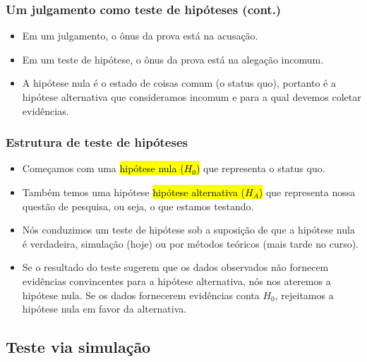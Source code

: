 
\begin{frame}
\frametitle{Um julgamento como teste de hipóteses (cont.)}

\begin{itemize}
\justifying
\item Em um julgamento, o ônus da prova está na acusação.
\justifying
\item Em um teste de hipótese, o ônus da prova está na alegação incomum.
\justifying
\item A hipótese nula é o estado de coisas comum (o status quo), portanto é a hipótese alternativa que consideramos incomum e para a qual devemos coletar evidências.

\end{itemize}

\end{frame}


\begin{frame}
\frametitle{Estrutura de teste de hipóteses}

\begin{itemize}
\justifying
\item Começamos com uma \hl {hipótese nula ($ H_0 $)} que representa o status quo.
\justifying
\item Também temos uma hipótese \hl {hipótese alternativa ($ H_A $)} que representa nossa questão de pesquisa, ou seja, o que estamos testando.
\justifying
\item Nós conduzimos um teste de hipótese sob a suposição de que a hipótese nula é verdadeira, simulação (hoje) ou por métodos teóricos (mais tarde no curso).
\justifying
\item Se o resultado do teste sugerem que os dados observados não fornecem evidências convincentes para a hipótese alternativa, nós nos ateremos a hipótese nula. Se os dados fornecerem evidências conta $H_0$, rejeitamos a hipótese nula em favor da alternativa.

\end{itemize}

\end{frame}


\subsection{Teste via simulação}

